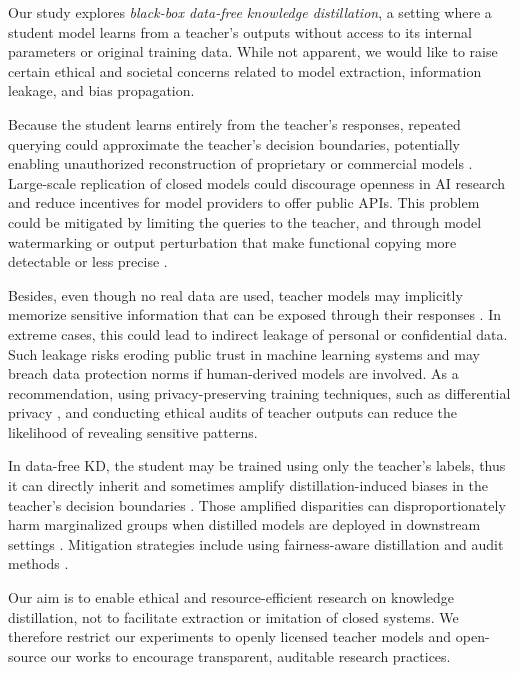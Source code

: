 \begin{foldable}
    Our study explores \textit{black-box data-free knowledge distillation}, a setting where a student model learns from a teacher's outputs without access to its internal parameters or original training data.
    While not apparent, we would like to raise certain ethical and societal concerns related to model extraction, information leakage, and bias propagation.
\end{foldable}

\begin{foldable}
    Because the student learns entirely from the teacher's responses, repeated querying could approximate the teacher's decision boundaries, potentially enabling unauthorized reconstruction of proprietary or commercial models \citep{tramer2016stealing,orekondy2019knockoff,jagielski2020high}.
    Large-scale replication of closed models could discourage openness in AI research and reduce incentives for model providers to offer public APIs.
    This problem could be mitigated by limiting the queries to the teacher, and through model watermarking or output perturbation that make functional copying more detectable or less precise \citep{jia2021entangled,wang2024defense}.
\end{foldable}

\begin{foldable}
    Besides, even though no real data are used, teacher models may implicitly memorize sensitive information that can be exposed through their responses \citep{carlini2021extracting}.
    In extreme cases, this could lead to indirect leakage of personal or confidential data.
    Such leakage risks eroding public trust in machine learning systems and may breach data protection norms if human-derived models are involved.
    As a recommendation, using privacy-preserving training techniques, such as differential privacy \citep{flemings2024differentially}, and conducting ethical audits of teacher outputs can reduce the likelihood of revealing sensitive patterns.
\end{foldable}

\begin{foldable}
    In data-free KD, the student may be trained using only the teacher's labels, thus it can directly inherit and sometimes amplify distillation-induced biases in the teacher's decision boundaries \citep{hooker2020characterising,ahn2022knowledge}.
    Those amplified disparities can disproportionately harm marginalized groups when distilled models are deployed in downstream settings \citep{buolamwini2018gender}.
    Mitigation strategies include using fairness-aware distillation and audit methods \citep{chai2022fairness,masroor2024fair}.
\end{foldable}

\begin{foldable}
    Our aim is to enable ethical and resource-efficient research on knowledge distillation, not to facilitate extraction or imitation of closed systems.
    We therefore restrict our experiments to openly licensed teacher models and open-source our works to encourage transparent, auditable research practices.
\end{foldable}
